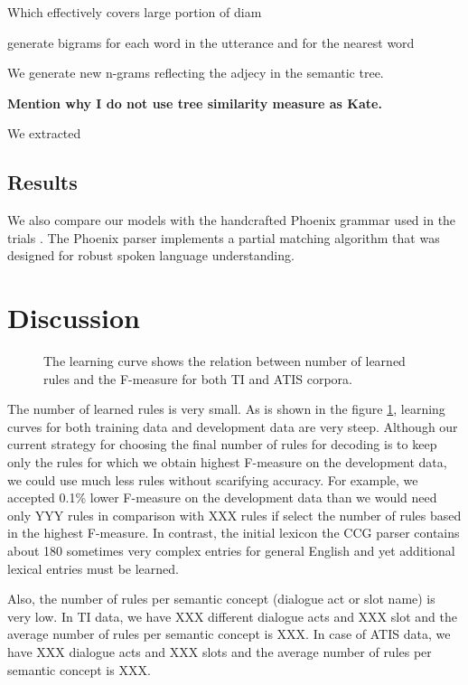 \documentclass[11pt]{article}
\newcommand{\efgr}[2]{
  \begin{figure}[htbp]
    \makebox[8.5cm]{\framebox[5cm]{\rule{0pt}{5cm}}}
    \caption{#2}
    \label{#1}
  \end{figure}
}
\begin{document}
Which effectively covers large portion of diam


generate bigrams for each word in the utterance and for the nearest word 






We generate new n-grams reflecting the adjecy in the semantic tree.


\textbf{Mention why I do not use tree similarity measure as Kate.}


We extracted 

\subsection{Results}

We also compare our models with the handcrafted Phoenix grammar \cite{ward91} used in the trials \cite{williams07,thomson08}. The Phoenix parser implements a partial matching algorithm that was designed for robust spoken language understanding.

\section{Discussion}

\efgr{fig:learning:curve}{The learning curve shows the relation between number of learned rules and the F-measure for both TI and ATIS corpora.}

The number of learned rules is very small. As is shown in the figure \ref{fig:learning:curve}, learning curves for both training data and development data are very steep. Although our current strategy for choosing the final number of rules for decoding is to keep only the rules for which we obtain highest F-measure on the development data, we could use much less rules without scarifying accuracy. For example, we accepted 0.1\% lower F-measure on the development data than we would need only YYY rules in comparison with XXX rules if select the number of rules based in the highest F-measure. In contrast, the initial lexicon the CCG parser \cite{zettlemoyer07} contains about 180 sometimes very complex entries for general English and yet additional lexical entries must be learned.

Also, the number of rules per semantic concept (dialogue act or slot name) is very low. In TI data, we have XXX different dialogue acts and XXX slot and the average number of rules per semantic concept is XXX. In case of ATIS data, we have XXX dialogue acts and XXX slots and the average number of rules per semantic concept is XXX.
\end{document}
